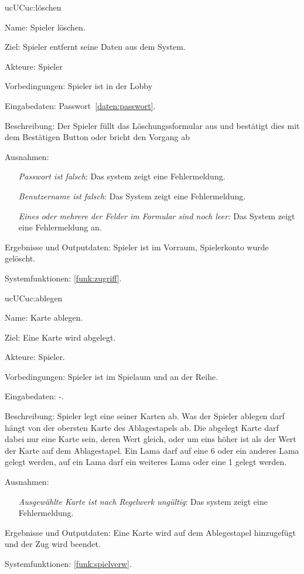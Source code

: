 \begin{description}[leftmargin=5em, style=sameline]
	\begin{lhp}{uc}{UC}{uc:löschen} %
		\item [Name:] Spieler löschen.
		\item [Ziel:] Spieler entfernt seine Daten aus dem System.
		\item [Akteure:] Spieler
		\item [Vorbedingungen:] Spieler ist in der Lobby
		\item [Eingabedaten:] Passwort~\ref{daten:passwort}.
		\item [Beschreibung:]  Der Spieler füllt das Löschungssformular aus und bestätigt dies mit dem Bestätigen Button oder bricht den Vorgang ab
		\item [Ausnahmen:] \hfill
			\begin{itemize} 
				\item[] \textit{Passwort ist falsch}: Das system zeigt eine Fehlermeldung.
				\item[] \textit{Benutzername ist falsch}: Das System zeigt eine Fehlermeldung.
				\item[] \textit{Eines oder mehrere der Felder im Formular sind noch leer:} Das System zeigt eine Fehlermeldung an.
			\end{itemize}
		\item [Ergebnisse und Outputdaten:] Spieler ist im Vorraum, Spielerkonto wurde gelöscht.	
		\item [Systemfunktionen:] \ref{funk:zugriff}.
	\end{lhp}
	
	\begin{lhp}{uc}{UC}{uc:ablegen} %
		\item [Name:] Karte ablegen.
		\item [Ziel:] Eine Karte wird abgelegt.
		\item [Akteure:] Spieler.
		\item [Vorbedingungen:] Spieler ist im Spielaum und an der Reihe.
		\item [Eingabedaten:] -. 
		\item [Beschreibung:] Spieler legt eine seiner Karten ab. Was der Spieler ablegen darf hängt von der obersten Karte des Ablagestapels ab. Die abgelegt Karte darf dabei nur eine Karte sein, deren Wert gleich, oder um eins höher ist als der Wert der Karte auf dem Ablagestapel. Ein Lama darf auf eine 6 oder ein anderes Lama gelegt werden, auf ein Lama darf ein weiteres Lama oder eine 1 gelegt werden.
		\item [Ausnahmen:] \hfill
		\begin{itemize} 
				\item[] \textit{Ausgewählte Karte ist nach Regelwerk ungültig}: Das system zeigt eine Fehlermeldung.
		\end{itemize}
		\item [Ergebnisse und Outputdaten:] Eine Karte wird auf dem Ablegestapel hinzugefügt und der Zug wird beendet.	
		\item [Systemfunktionen:] \ref{funk:spielverw}. %
	\end{lhp}
	

\end{description}

